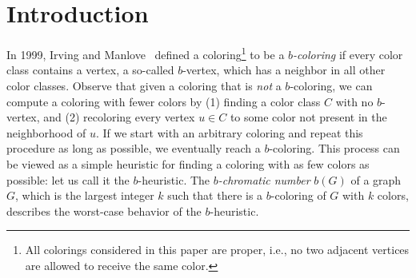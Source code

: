 \documentclass[runningheads, envcountsame]{llncs}
\begin{document}
\section{Introduction}

In 1999, Irving and Manlove~\cite{IRVING1999127} defined a coloring\footnote{All colorings considered in this paper are proper, i.e., no two adjacent vertices are allowed to receive the same color.} to be a \emph{$b$-coloring} if every color class contains a vertex, a so-called $b$-vertex, which has a neighbor in all other color classes.
Observe that given a coloring that is \emph{not} a $b$-coloring, we can compute a coloring with fewer colors by (1) finding a color class $C$ with no $b$-vertex, and (2) recoloring every vertex $u \in C$ to some color not present in the neighborhood of $u$.
If we start with an arbitrary coloring and repeat this procedure as long as possible, we eventually reach a $b$-coloring.
This process can be viewed as a simple heuristic for finding a coloring with as few colors as possible: let us call it the $b$-heuristic.
The \emph{$b$-chromatic number} $b(G)$ of a graph $G$, which is the largest integer $k$ such that there is a $b$-coloring of $G$ with $k$ colors, describes the worst-case behavior of the $b$-heuristic.
\end{document}
